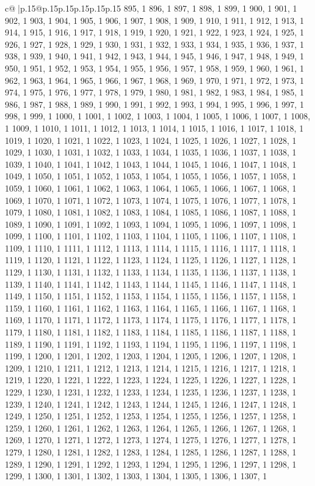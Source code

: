 \documentclass{article}
\begin{document}
{\begin{supertabular}{c@{$\;$}|p{.15\linewidth}@{}p{.15\linewidth}p{.15\linewidth}p{.15\linewidth}p{.15\linewidth}p{.15\linewidth}}
{{{895, 1 896, 1 897, 1 898, 1 899, 1 900, 1 901, 1 902, 1 903, 1 904, 1 905, 1 906, 1 907, 1 908, 1 909, 1 910, 1 911, 1 912, 1 913, 1 914, 1 915, 1 916, 1 917, 1 918, 1 919, 1 920, 1 921, 1 922, 1 923, 1 924, 1 925, 1 926, 1 927, 1 928, 1 929, 1 930, 1 931, 1 932, 1 933, 1 934, 1 935, 1 936, 1 937, 1 938, 1 939, 1 940, 1 941, 1 942, 1 943, 1 944, 1 945, 1 946, 1 947, 1 948, 1 949, 1 950, 1 951, 1 952, 1 953, 1 954, 1 955, 1 956, 1 957, 1 958, 1 959, 1 960, 1 961, 1 962, 1 963, 1 964, 1 965, 1 966, 1 967, 1 968, 1 969, 1 970, 1 971, 1 972, 1 973, 1 974, 1 975, 1 976, 1 977, 1 978, 1 979, 1 980, 1 981, 1 982, 1 983, 1 984, 1 985, 1 986, 1 987, 1 988, 1 989, 1 990, 1 991, 1 992, 1 993, 1 994, 1 995, 1 996, 1 997, 1 998, 1 999, 1 1000, 1 1001, 1 1002, 1 1003, 1 1004, 1 1005, 1 1006, 1 1007, 1 1008, 1 1009, 1 1010, 1 1011, 1 1012, 1 1013, 1 1014, 1 1015, 1 1016, 1 1017, 1 1018, 1 1019, 1 1020, 1 1021, 1 1022, 1 1023, 1 1024, 1 1025, 1 1026, 1 1027, 1 1028, 1 1029, 1 1030, 1 1031, 1 1032, 1 1033, 1 1034, 1 1035, 1 1036, 1 1037, 1 1038, 1 1039, 1 1040, 1 1041, 1 1042, 1 1043, 1 1044, 1 1045, 1 1046, 1 1047, 1 1048, 1 1049, 1 1050, 1 1051, 1 1052, 1 1053, 1 1054, 1 1055, 1 1056, 1 1057, 1 1058, 1 1059, 1 1060, 1 1061, 1 1062, 1 1063, 1 1064, 1 1065, 1 1066, 1 1067, 1 1068, 1 1069, 1 1070, 1 1071, 1 1072, 1 1073, 1 1074, 1 1075, 1 1076, 1 1077, 1 1078, 1 1079, 1 1080, 1 1081, 1 1082, 1 1083, 1 1084, 1 1085, 1 1086, 1 1087, 1 1088, 1 1089, 1 1090, 1 1091, 1 1092, 1 1093, 1 1094, 1 1095, 1 1096, 1 1097, 1 1098, 1 1099, 1 1100, 1 1101, 1 1102, 1 1103, 1 1104, 1 1105, 1 1106, 1 1107, 1 1108, 1 1109, 1 1110, 1 1111, 1 1112, 1 1113, 1 1114, 1 1115, 1 1116, 1 1117, 1 1118, 1 1119, 1 1120, 1 1121, 1 1122, 1 1123, 1 1124, 1 1125, 1 1126, 1 1127, 1 1128, 1 1129, 1 1130, 1 1131, 1 1132, 1 1133, 1 1134, 1 1135, 1 1136, 1 1137, 1 1138, 1 1139, 1 1140, 1 1141, 1 1142, 1 1143, 1 1144, 1 1145, 1 1146, 1 1147, 1 1148, 1 1149, 1 1150, 1 1151, 1 1152, 1 1153, 1 1154, 1 1155, 1 1156, 1 1157, 1 1158, 1 1159, 1 1160, 1 1161, 1 1162, 1 1163, 1 1164, 1 1165, 1 1166, 1 1167, 1 1168, 1 1169, 1 1170, 1 1171, 1 1172, 1 1173, 1 1174, 1 1175, 1 1176, 1 1177, 1 1178, 1 1179, 1 1180, 1 1181, 1 1182, 1 1183, 1 1184, 1 1185, 1 1186, 1 1187, 1 1188, 1 1189, 1 1190, 1 1191, 1 1192, 1 1193, 1 1194, 1 1195, 1 1196, 1 1197, 1 1198, 1 1199, 1 1200, 1 1201, 1 1202, 1 1203, 1 1204, 1 1205, 1 1206, 1 1207, 1 1208, 1 1209, 1 1210, 1 1211, 1 1212, 1 1213, 1 1214, 1 1215, 1 1216, 1 1217, 1 1218, 1 1219, 1 1220, 1 1221, 1 1222, 1 1223, 1 1224, 1 1225, 1 1226, 1 1227, 1 1228, 1 1229, 1 1230, 1 1231, 1 1232, 1 1233, 1 1234, 1 1235, 1 1236, 1 1237, 1 1238, 1 1239, 1 1240, 1 1241, 1 1242, 1 1243, 1 1244, 1 1245, 1 1246, 1 1247, 1 1248, 1 1249, 1 1250, 1 1251, 1 1252, 1 1253, 1 1254, 1 1255, 1 1256, 1 1257, 1 1258, 1 1259, 1 1260, 1 1261, 1 1262, 1 1263, 1 1264, 1 1265, 1 1266, 1 1267, 1 1268, 1 1269, 1 1270, 1 1271, 1 1272, 1 1273, 1 1274, 1 1275, 1 1276, 1 1277, 1 1278, 1 1279, 1 1280, 1 1281, 1 1282, 1 1283, 1 1284, 1 1285, 1 1286, 1 1287, 1 1288, 1 1289, 1 1290, 1 1291, 1 1292, 1 1293, 1 1294, 1 1295, 1 1296, 1 1297, 1 1298, 1 1299, 1 1300, 1 1301, 1 1302, 1 1303, 1 1304, 1 1305, 1 1306, 1 1307, 1 }}}
\end{supertabular}}
\end{document}
